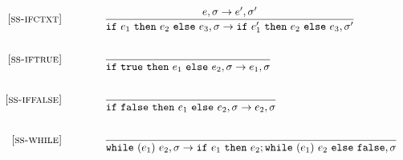 \documentclass{article}
\begin{document}
\begin{figure}[H]\label{fig:smallstep}
\[
\begin{array}{r@{\qquad\qquad}l}
\ssrule{ss-ifctxt}{
  \sstep{e}{\sigma}{e'}{\sigma'}
}{
  \sstep{\ife{e_1}{e_2}{e_3}}{\sigma}{\ife{e_1'}{e_2}{e_3}}{\sigma'}
}
\ssrule{ss-iftrue}{
}{
  \sstep{\ife{\true}{e_1}{e_2}}{\sigma}{e_1}{\sigma}
}
\ssrule{ss-iffalse}{
}{
  \sstep{\ife{\false}{e_1}{e_2}}{\sigma}{e_2}{\sigma}
}
\ssrule{ss-while}{
}{
  \sstep{\whilee{e_1}{e_2}}{\sigma}{\ife{e_1}{e_2;\whilee{e_1}{e_2}}{\false}}{\sigma}
}
\end{array}
\]
\end{figure}
\end{document}
